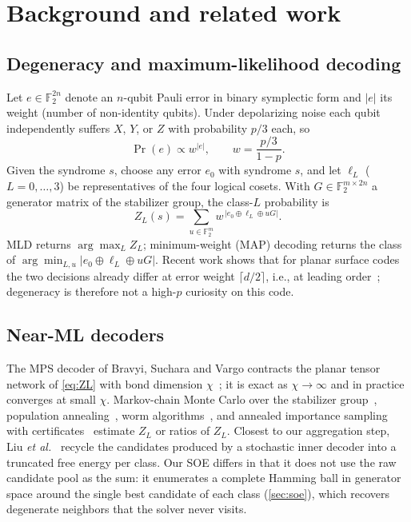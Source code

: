 \documentclass[journal]{IEEEtran}
\newcommand{\F}{\mathbb{F}_2}
\begin{document}
\section{Background and related work}
\label{sec:related}

\subsection{Degeneracy and maximum-likelihood decoding}
Let $e\in\F^{2n}$ denote an $n$-qubit Pauli error in binary symplectic form and $|e|$ its weight (number of non-identity qubits). Under depolarizing noise each qubit independently suffers $X$, $Y$, or $Z$ with probability $p/3$ each, so
\begin{equation}
\Pr(e)\propto w^{|e|},\qquad w=\frac{p/3}{1-p}.
\end{equation}
Given the syndrome $s$, choose any error $e_0$ with syndrome $s$, and let $\ell_L$ ($L=0,\dots,3$) be representatives of the four logical cosets. With $G\in\F^{m\times 2n}$ a generator matrix of the stabilizer group, the class-$L$ probability is
\begin{equation}
Z_L(s)=\sum_{u\in\F^m} w^{\,|e_0\oplus \ell_L\oplus uG|}.
\label{eq:ZL}
\end{equation}
MLD returns $\arg\max_L Z_L$; minimum-weight (MAP) decoding returns the class of $\arg\min_{L,u}|e_0\oplus\ell_L\oplus uG|$. Recent work shows that for planar surface codes the two decisions already differ at error weight $\lceil d/2\rceil$, i.e., at leading order~\cite{zhao2026}; degeneracy is therefore not a high-$p$ curiosity on this code.

\subsection{Near-ML decoders}
The MPS decoder of Bravyi, Suchara and Vargo contracts the planar tensor network of \cref{eq:ZL} with bond dimension $\chi$~\cite{bravyi2014}; it is exact as $\chi\to\infty$ and in practice converges at small $\chi$. Markov-chain Monte Carlo over the stabilizer group~\cite{wootton2012,hutter2014}, population annealing~\cite{martinezgarcia2024}, worm algorithms~\cite{tobias2026}, and annealed importance sampling with certificates~\cite{krishnamoorthy2026} estimate $Z_L$ or ratios of $Z_L$. Closest to our aggregation step, Liu \emph{et al.}~\cite{liu2026amld} recycle the candidates produced by a stochastic inner decoder into a truncated free energy per class. Our SOE differs in that it does not use the raw candidate pool as the sum: it enumerates a complete Hamming ball in generator space around the single best candidate of each class (\cref{sec:soe}), which recovers degenerate neighbors that the solver never visits.
\end{document}
